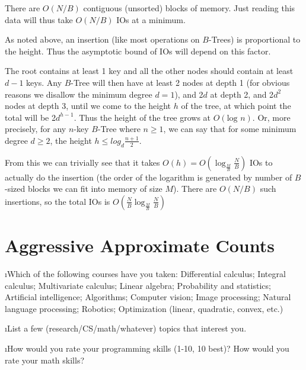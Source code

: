 \documentclass[fleqn]{article}
\begin{document}
There are $O(N/B)$ contiguous (unsorted) blocks of memory. Just reading this data will thus take $O(N/B)$ IOs at a minimum.

As noted above, an insertion (like most operations on $B$-Trees) is proportional to the height. Thus the asymptotic bound of IOs will depend on this factor.

The root contains at least 1 key and all the other nodes should contain at least $d - 1$ keys. Any $B$-Tree will then have at least 2 nodes at depth 1 (for obvious reasons we disallow the minimum degree $d = 1$), and 2$d$ at depth 2, and 2$d^2$ nodes at depth 3, until we come to the height $h$ of the tree, at which point the total will be 2$d^{h-1}$. Thus the height of the tree grows at $O(\mbox{log } n)$. Or, more precisely, for any $n$-key $B$-Tree where $n \ge 1$, we can say that for some minimum degree $d \ge 2$, the height $h \le log_d \frac{n+1}{2}$.

From this we can trivially see that it takes $O(h) = O(\log_\frac{M}{B}\frac{N}{B})$ IOs to actually do the insertion (the order of the logarithm is generated by number of $B$-sized blocks we can fit into memory of size $M$). There are $O(N/B)$ such insertions, so the total IOs is $O(\frac{N}{B} \log_\frac{M}{B}\frac{N}{B})$


\section{Aggressive Approximate Counts}

\bee
\i Which of the following courses have you taken:
     Differential calculus;
     Integral calculus;
     Multivariate calculus;
     Linear algebra;
     Probability and statistics;
     Artificial intelligence;
     Algorithms;
     Computer vision;
     Image processing;
     Natural language processing;
     Robotics;
     Optimization (linear, quadratic, convex, etc.)



\i List a few (research/CS/math/whatever) topics that interest you.


\i How would you rate your programming skills (1-10, 10 best)?  How would you rate your math skills?
\end{document}

